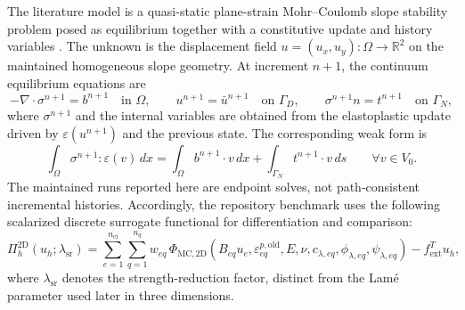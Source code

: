 The literature model is a quasi-static plane-strain Mohr--Coulomb slope
stability problem posed as equilibrium together with a constitutive update and
history variables
\citep{davis1968plasticity,simo1985consistent,simo1998compinel,tschuchnigg2015nonassociated,sysala2017returnmapping,sysala2021optimization}.
The unknown is the displacement field
$u = (u_x,u_y):\Omega \to \mathbb{R}^2$ on the maintained homogeneous slope
geometry. At increment $n+1$, the continuum equilibrium equations are
\begin{equation}
  -\nabla \cdot \sigma^{n+1} = b^{n+1}
  \quad \text{in }\Omega,
  \qquad
  u^{n+1} = \bar u^{n+1} \quad \text{on }\Gamma_D,
  \qquad
  \sigma^{n+1}n = t^{n+1} \quad \text{on }\Gamma_N,
  \label{eq:plasticity2d-strong}
\end{equation}
where $\sigma^{n+1}$ and the internal variables are obtained from the
elastoplastic update driven by $\varepsilon(u^{n+1})$ and the previous state.
The corresponding weak form is
\begin{equation}
  \int_{\Omega} \sigma^{n+1} : \varepsilon(v) \, dx
  =
  \int_{\Omega} b^{n+1} \cdot v \, dx
  + \int_{\Gamma_N} t^{n+1} \cdot v \, ds
  \qquad \forall v \in V_0.
  \label{eq:plasticity2d-weak}
\end{equation}
The maintained runs reported here are endpoint solves, not path-consistent
incremental histories. Accordingly, the repository benchmark uses the following
scalarized discrete surrogate functional for differentiation and comparison:
\begin{equation}
  \Pi_h^{2\mathrm{D}}(u_h;\lambda_{\mathrm{sr}})
  =
  \sum_{e=1}^{n_{\mathrm{el}}}
  \sum_{q=1}^{n_q}
    w_{eq}\,
    \Phi_{\mathrm{MC},2\mathrm{D}}
    \!\left(
      B_{eq}u_e,\varepsilon^{p,\mathrm{old}}_{eq},
      E,\nu,c_{\lambda,eq},\phi_{\lambda,eq},\psi_{\lambda,eq}
    \right)
  - f_{\mathrm{ext}}^T u_h,
  \label{eq:plasticity2d-discrete}
\end{equation}
where $\lambda_{\mathrm{sr}}$ denotes the strength-reduction factor, distinct
from the Lam{\'e} parameter used later in three dimensions.

